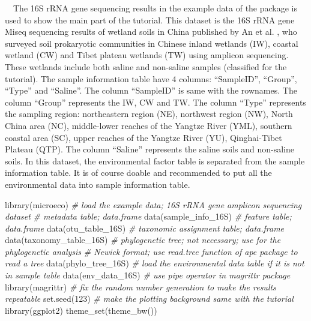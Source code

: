 \documentclass[
]{book}
\newenvironment{Shaded}{\begin{snugshade}}{\end{snugshade}}
\newcommand{\CommentTok}[1]{\textcolor[rgb]{0.56,0.35,0.01}{\textit{#1}}}
\newcommand{\DecValTok}[1]{\textcolor[rgb]{0.00,0.00,0.81}{#1}}
\newcommand{\FunctionTok}[1]{\textcolor[rgb]{0.00,0.00,0.00}{#1}}
\newcommand{\NormalTok}[1]{#1}
\begin{document}
　The 16S rRNA gene sequencing results in the example data of the package is used to show the main part of the tutorial.
This dataset is the 16S rRNA gene Miseq sequencing results of wetland soils in China published by An et al. \citep{An_Soil_2019},
who surveyed soil prokaryotic communities in Chinese inland wetlands (IW),
coastal wetland (CW) and Tibet plateau wetlands (TW) using amplicon sequencing.
These wetlands include both saline and non-saline samples (classified for the tutorial).
The sample information table have 4 columns: ``SampleID'', ``Group'', ``Type'' and ``Saline''.
The column ``SampleID'' is same with the rownames.
The column ``Group'' represents the IW, CW and TW.
The column ``Type'' represents the sampling region: northeastern region (NE), northwest region (NW), North China area (NC),
middle-lower reaches of the Yangtze River (YML), southern coastal area (SC), upper reaches of the Yangtze River (YU), Qinghai-Tibet Plateau (QTP).
The column ``Saline'' represents the saline soils and non-saline soils.
In this dataset, the environmental factor table is separated from the sample information table.
It is of course doable and recommended to put all the environmental data into sample information table.

\begin{Shaded}
\begin{Highlighting}[]
\FunctionTok{library}\NormalTok{(microeco)}
\CommentTok{\# load the example data; 16S rRNA gene amplicon sequencing dataset}
\CommentTok{\# metadata table; data.frame}
\FunctionTok{data}\NormalTok{(sample\_info\_16S)}
\CommentTok{\# feature table; data.frame}
\FunctionTok{data}\NormalTok{(otu\_table\_16S)}
\CommentTok{\# taxonomic assignment table; data.frame}
\FunctionTok{data}\NormalTok{(taxonomy\_table\_16S)}
\CommentTok{\# phylogenetic tree; not necessary; use for the phylogenetic analysis}
\CommentTok{\# Newick format; use read.tree function of ape package to read a tree}
\FunctionTok{data}\NormalTok{(phylo\_tree\_16S)}
\CommentTok{\# load the environmental data table if it is not in sample table}
\FunctionTok{data}\NormalTok{(env\_data\_16S)}
\CommentTok{\# use pipe operator in magrittr package}
\FunctionTok{library}\NormalTok{(magrittr)}
\CommentTok{\# fix the random number generation to make the results repeatable}
\FunctionTok{set.seed}\NormalTok{(}\DecValTok{123}\NormalTok{)}
\CommentTok{\# make the plotting background same with the tutorial}
\FunctionTok{library}\NormalTok{(ggplot2)}
\FunctionTok{theme\_set}\NormalTok{(}\FunctionTok{theme\_bw}\NormalTok{())}
\end{Highlighting}
\end{Shaded}
\end{document}
